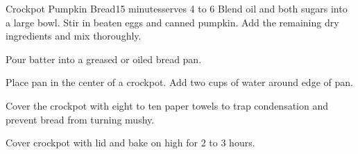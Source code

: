 \begin{recipe}{Crockpot Pumpkin Bread}{15 minutes}{serves 4 to 6}
Blend oil and both sugars into a large bowl.
Stir in beaten eggs and canned pumpkin. Add the remaining dry ingredients and
mix thoroughly.\newstep

Pour batter into a greased or oiled bread pan.\newstep

Place pan in the center of a crockpot. Add two cups of water around edge of
pan.\newstep

Cover the crockpot with eight to ten paper towels to trap condensation and
prevent bread from turning mushy.\newstep

Cover crockpot with lid and bake on high for 2 to 3 hours.
\end{recipe}
